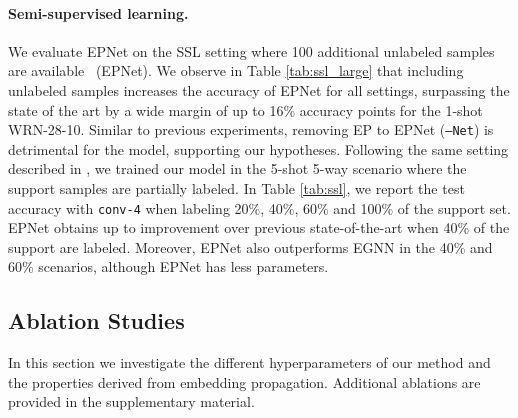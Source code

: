 \documentclass[runningheads]{llncs}
\begin{document}
\paragraph{Semi-supervised learning.} We evaluate EPNet on the SSL setting where 100 additional unlabeled samples are available~\cite{ren2018metalearning,liu2018learning} (EPNet). We observe in Table \ref{tab:ssl_large} that including unlabeled samples increases the accuracy of EPNet for all settings, surpassing the state of the art by a wide margin of up to 16\% accuracy points for the 1-shot WRN-28-10. Similar to previous experiments, removing EP to EPNet (\texttt{--Net}) is detrimental for the model, supporting our hypotheses. Following the same setting described in \cite{garcia2017few,kim2019edge}, we trained our model in the 5-shot 5-way scenario where the support samples are partially labeled. In Table \ref{tab:ssl}, we report the test accuracy with \texttt{conv-4} when labeling 20\%, 40\%, 60\% and 100\% of the support set. EPNet obtains up to  improvement over previous state-of-the-art when 40\% of the support are labeled. Moreover, EPNet also outperforms EGNN \cite{kim2019edge} in the 40\% and 60\% scenarios, although EPNet has  less parameters. 

\subsection{Ablation Studies}
In this section we investigate the different hyperparameters of our method and the properties derived from embedding propagation. Additional ablations are provided in the supplementary material.

\begin{table}[t]
\centering
\caption{Algorithm ablation with conv-4 on 1-shot \textit{mini}Imagenet. EFT: Episodic Fine-tuning, ROT: Rotation loss, LP: Label Propagation, EP: Embedding Propagation }
\label{tab:pipeline-ablation}
\end{table}
\end{document}
